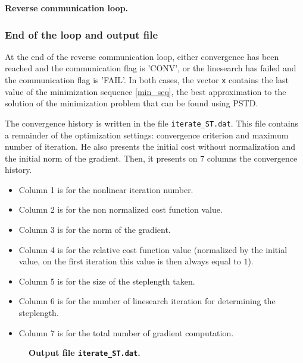 \documentclass[a4paper,twoside,final,onecolumn,11pt,openright]{article}
\begin{document}
\framebox{
\small
 
}
\normalsize
\begin{center}
\textbf{Reverse communication loop.} 
\end{center}

\subsubsection{End of the loop and output file}
At the end of the reverse communication loop, either convergence has been reached and the communication flag is 'CONV', or the linesearch has failed and the communication flag is 'FAIL'. In both cases, the vector \texttt{x} contains the last value of the minimization sequence \eqref{min_seq}, the best approximation to the solution of the minimization problem that can be found using PSTD. 

The convergence history is written in the file \texttt{iterate\_ST.dat}. This file contains a remainder of the optimization settings: convergence criterion and maximum number of iteration. He also presents the initial cost without normalization and the initial norm of the gradient. Then, it presents on $7$ columns the convergence history.
\begin{itemize}
\item Column 1 is for the nonlinear iteration number.
\item Column 2 is for the non normalized cost function value.
\item Column 3 is for the norm of the gradient. 
\item Column 4 is for the relative cost function value (normalized by the initial value, on the first iteration this value is then always equal to $1$).
\item Column 5 is for the size of the steplength taken.
\item Column 6 is for the number of linesearch iteration for determining the steplength.
\item Column 7 is for the total number of gradient computation.
\end{itemize}

\begin{figure}
\tiny
 
\normalsize
\begin{center}
\textbf{Output file \texttt{iterate\_ST.dat}.} 
\end{center} 
\end{figure}
\end{document}
